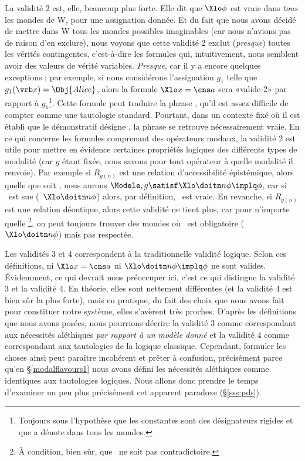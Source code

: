 La validité 2 est, elle, beaucoup plus forte. 
Elle dit que $\Xlo\phi$ est vraie dans \emph{tous} les mondes de \Unv W, pour une assignation donnée. 
Et du fait que nous avons décidé de mettre dans \Unv W tous les mondes possibles imaginables (car nous n'avions pas de raison d'en exclure), nous voyons que cette validité 2 exclut (\emph{presque}) toutes les vérités contingentes, c'est-à-dire les formules qui, intuitivement,  nous semblent avoir des valeurs de vérité variables.  
\emph{Presque}, car il y a encore quelques exceptions ; par exemple, si nous considérons l'assignation $g_1$ telle que $g_1(\vrb x)=\Obj{Alice}$, alors la formule \(\Xlo x=\cns a\) sera «valide-2» par rapport à $g_1$\footnote{Toujours sous l'hypothèse que les constantes sont des désignateurs rigides et que \cns a dénote  dans tous les mondes.}.
Cette formule peut traduire la phrase , qu'il est assez difficile de compter comme une tautologie standard. Pourtant, dans un contexte fixé où il est établi que le démonstratif  désigne , la phrase se retrouve nécessairement vraie.
En ce qui concerne les formules comprenant des opérateurs modaux, la validité 2 est utile pour mettre en évidence certaines propriétés logiques des différents types de modalité (car $g$ étant fixée, nous savons pour tout opérateur à quelle modalité il renvoie).  Par exemple si $R_{g(n)}$ est une relation d'accessibilité épistémique, alors quelle que soit \vrb\phi, nous aurons $\Modele,g\satisf \Xlo\doitn n\phi\implq\phi$, car si \vrb\phi\ est sue (\ie\ $\Xlo\doitn n\phi$) alors, par définition, \vrb\phi\ est vraie. 
En revanche, si $R_{g(n)}$ est une relation déontique, alors cette validité ne tient plus, car pour n'importe quelle \vrb\phi\footnote{À condition, bien sûr, que \vrb\phi\ ne soit pas contradictoire.}, on peut toujours trouver des mondes où \vrb\phi\ est obligatoire (\ie\ $\Xlo\doitn n\phi$) mais pas respectée.

Les validités 3 et 4 correspondent à la traditionnelle validité logique. 
Selon ces définitions, ni \(\Xlo x=\cns a\) ni \(\Xlo\doitn n\phi\implq\phi\) ne sont valides. 
Évidemment, ce qui devrait nous préoccuper ici, c'est ce qui distingue la validité 3 et la validité 4. En théorie, elles sont nettement différentes (et la validité 4 est bien sûr la plus forte), mais en pratique, du fait des choix que nous avons fait pour constituer notre système, elles s'avèrent très proches.
D'après les définitions que nous avons posées, nous pourrions décrire  la validité 3 comme correspondant aux nécessités aléthiques \emph{par rapport à un modèle donné} et la validité 4 comme correspondant aux tautologies de la logique classique. 
%
Cependant, formuler les choses ainsi peut paraître incohérent et prêter à confusion, précisément parce qu'en \S\ref{modalflavours1} nous avons défini les nécessités aléthiques comme identiques aux tautologies logiques. 
Nous allons donc prendre le temps d'examiner un peu plus précisément cet apparent paradoxe  (\S\ref{sss:pds}).



